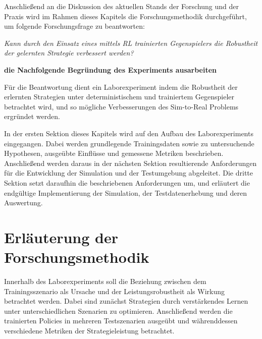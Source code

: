 Anschließend an die Diskussion des aktuellen Stands der Forschung und der Praxis wird im Rahmen dieses Kapitels die Forschungsmethodik durchgeführt, um folgende Forschungsfrage zu beantworten:

\textit{Kann durch den Einsatz eines mittels RL trainierten Gegenspielers die Robustheit der gelernten Strategie verbessert werden?}

\textbf{die Nachfolgende Begründung des Experiments ausarbeiten}

Für die Beantwortung dient ein Laborexperiment indem die Robustheit der erlernten Strategien unter deterministischem und trainiertem Gegenspieler betrachtet wird, und so mögliche Verbesserungen des Sim-to-Real Problems ergründet werden. 

In der ersten Sektion dieses Kapitels wird auf den Aufbau des Laborexperiments eingegangen.
Dabei werden grundlegende Trainingsdaten sowie zu untersuchende Hypothesen, ausgeübte Einflüsse und gemessene Metriken beschrieben.
Anschließend werden daraus in der nächsten Sektion resultierende Anforderungen für die Entwicklung der Simulation und der Testumgebung abgeleitet. 
Die dritte Sektion setzt daraufhin die beschriebenen Anforderungen um, und erläutert die endgültige Implementierung der Simulation, der Testdatenerhebung und deren Auswertung.

\section{Erläuterung der Forschungsmethodik}

Innerhalb des Laborexperiments soll die Beziehung zwischen dem Trainingsszenario als Ursache und der Leistungsrobustheit als Wirkung betrachtet werden.
Dabei sind zunächst Strategien durch verstärkendes Lernen unter unterschiedlichen Szenarien zu optimieren. 
Anschließend werden die trainierten Policies in mehreren Testszenarien ausgeübt und währenddessen verschiedene Metriken der Strategieleistung betrachtet.

